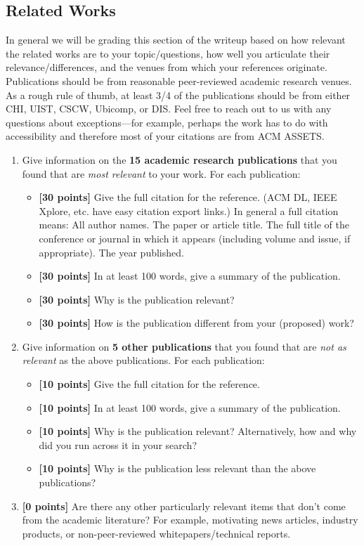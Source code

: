 \documentclass{article}
\begin{document}
\subsection{Related Works}
In general we will be grading this section of the writeup based on how relevant the related works are to your topic/questions, how well you articulate their relevance/differences, and the venues from which your references originate. Publications should be from reasonable peer-reviewed academic research venues. As a rough rule of thumb, at least 3/4 of the publications should be from either CHI, UIST, CSCW, Ubicomp, or DIS. Feel free to reach out to us with any questions about exceptions---for example, perhaps the work has to do with accessibility and therefore most of your citations are from ACM ASSETS.
\begin{enumerate}
    \item Give information on the \textbf{15 academic research publications} that you found that are \textit{most relevant} to your work. For each publication:
    \begin{itemize}
        \item \textbf{[30 points]} Give the full citation for the reference. (ACM DL, IEEE Xplore, etc. have easy citation export links.) In general a full citation means: All author names. The paper or article title. The full title of the conference or journal in which it appears (including volume and issue, if appropriate). The year published.
        \item \textbf{[30 points]} In at least 100 words, give a summary of the publication.
        \item \textbf{[30 points]} Why is the publication relevant?
        \item \textbf{[30 points]} How is the publication different from your (proposed) work?
    \end{itemize}
    \item Give information on \textbf{5 other publications} that you found that are \textit{not as relevant} as the above publications. For each publication:
    \begin{itemize}
        \item \textbf{[10 points]} Give the full citation for the reference.
        \item \textbf{[10 points]} In at least 100 words, give a summary of the publication.
        \item \textbf{[10 points]} Why is the publication relevant? Alternatively, how and why did you run across it in your search?
        \item \textbf{[10 points]} Why is the publication less relevant than the above publications?
        \end{itemize}
    \item \textbf{[0 points]} Are there any other particularly relevant items that don't come from the academic literature? For example, motivating news articles, industry products, or non-peer-reviewed whitepapers/technical reports.
\end{enumerate}
\end{document}
